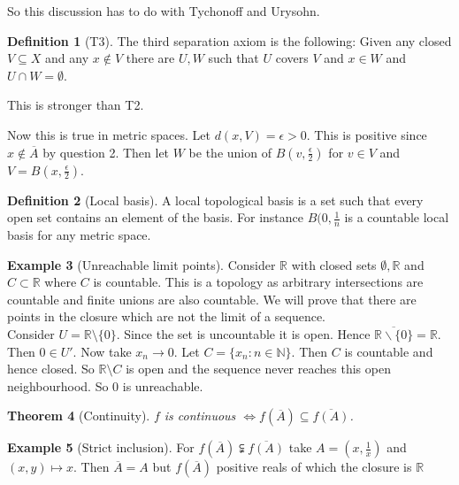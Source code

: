 \documentclass[11pt,a4paper]{article}
\newtheorem{theorem}{Theorem}[section]
\theoremstyle{definition}
\newtheorem{definition}[theorem]{Definition}
\newtheorem{example}[theorem]{Example}
\begin{document}
So this discussion has to do with Tychonoff and Urysohn.

\begin{definition}[T3]
The third separation axiom is the following: Given any closed $V \subseteq X$ and any $x \notin V$ there are $U,W$ such that $U$ covers $V$ and $x \in W$ and $U \cap W = \emptyset$. 
\end{definition}

This is stronger than T2.

Now this is true in metric spaces. Let $d(x,V) = \epsilon > 0$. This is positive since $x \notin \overline{A}$ by question 2. Then let $W$ be the union of $B(v, \frac{\epsilon}{2})$ for $v \in V$ and $V = B(x, \frac{\epsilon}{2})$.

\begin{definition}[Local basis]
A local topological basis is a set such that every open set contains an element of the basis. For instance $B(0,\frac{1}{n}$ is a countable local basis for any metric space.
\end{definition} 

\begin{example}[Unreachable limit points]

Consider $\mathbb{R}$ with closed sets $\emptyset, \mathbb{R}$ and $C \subset \mathbb{R}$ where $C$ is countable. This is a topology as arbitrary intersections are countable and finite unions are also countable. We will prove that there are points in the closure which are not the limit of a sequence.
\\
Consider $U = \mathbb{R} \setminus \{0\}$. Since the set is uncountable it is open. Hence $\overline{\mathbb{R} \smallsetminus \{0\}} = \mathbb{R}$. Then $0 \in U \prime$. Now take $x_n \to 0$. Let $C = \{x_n : n \in \mathbb{N}\}$. Then $C$ is countable and hence closed. So $\mathbb{R} \setminus C$ is open and the sequence never reaches this open neighbourhood. So 0 is unreachable. 
\end{example}

\begin{theorem}[Continuity]
$f$ is continuous $\iff f(\overline{A}) \subseteq \overline{f(A)}$. 
\end{theorem}

\begin{example}[Strict inclusion]
For $f(\overline{A}) \subsetneqq \overline{f(A)}$ take $A = {(x, \frac{1}{x})}$ and $(x,y) \mapsto x$. Then $\overline{A} = A$ but $f(\overline{A})$ positive reals of which the closure is $\mathbb{R}$
\end{example}
\end{document}
